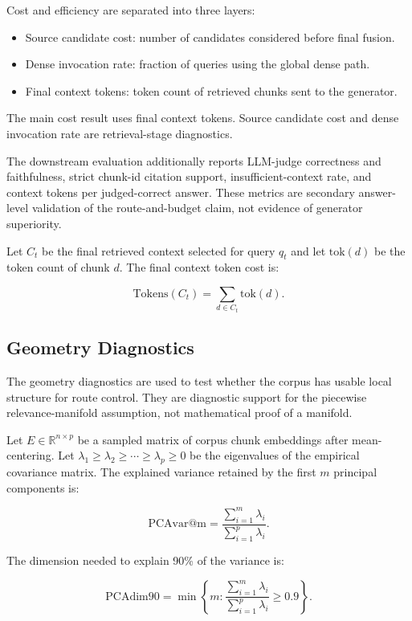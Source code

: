Cost and efficiency are separated into three layers:

\begin{itemize}
\item Source candidate cost: number of candidates considered before final fusion.
\item Dense invocation rate: fraction of queries using the global dense path.
\item Final context tokens: token count of retrieved chunks sent to the generator.
\end{itemize}

The main cost result uses final context tokens. Source candidate cost and dense invocation rate are retrieval-stage diagnostics.

The downstream evaluation additionally reports LLM-judge correctness and faithfulness, strict chunk-id citation support, insufficient-context rate, and context tokens per judged-correct answer. These metrics are secondary answer-level validation of the route-and-budget claim, not evidence of generator superiority.

Let $C_t$ be the final retrieved context selected for query $q_t$ and let $\mathrm{tok}(d)$ be the token count of chunk $d$. The final context token cost is:

\[
\mathrm{Tokens}(C_t) =
\sum_{d \in C_t} \mathrm{tok}(d).
\]

\subsection{Geometry Diagnostics}
\label{sec:05-experimental-setup:geometry-diagnostics}

The geometry diagnostics are used to test whether the corpus has usable local structure for route control. They are diagnostic support for the piecewise relevance-manifold assumption, not mathematical proof of a manifold.

Let $E \in \mathbb{R}^{n \times p}$ be a sampled matrix of corpus chunk embeddings after mean-centering. Let $\lambda_1 \ge \lambda_2 \ge \cdots \ge \lambda_p \ge 0$ be the eigenvalues of the empirical covariance matrix. The explained variance retained by the first $m$ principal components is:

\[
\mathrm{PCAvar@m} =
\frac{\sum_{i=1}^{m} \lambda_i}
     {\sum_{i=1}^{p} \lambda_i}.
\]

The dimension needed to explain 90\% of the variance is:

\[
\mathrm{PCAdim90} =
\min \left\{m:
\frac{\sum_{i=1}^{m} \lambda_i}
     {\sum_{i=1}^{p} \lambda_i}
\ge 0.9
\right\}.
\]

